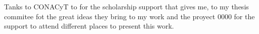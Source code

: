 
\begin{frame}
  
  Tanks to CONACyT to for the scholarship support that gives me,
  to my thesis commitee fot the great ideas they bring to my work 
  and the proyect 0000 for the support to attend different places 
  to present this work.

\end{frame}

